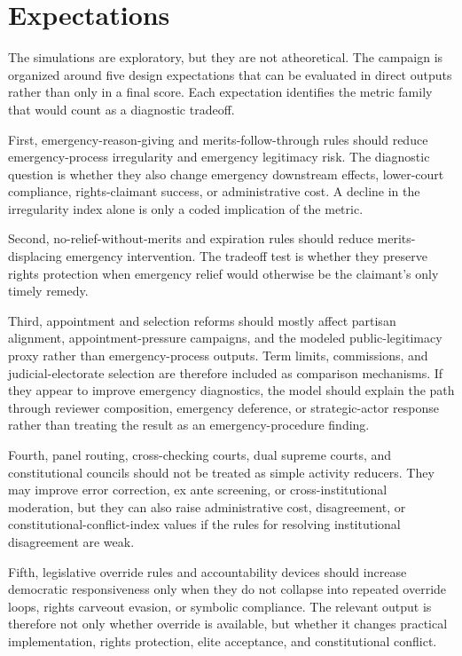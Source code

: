 \documentclass[
    journal=jlc,
    manuscript=research-article,
    year=2026,
  ]{cup-journal}
\begin{document}
\section{Expectations}

The simulations are exploratory, but they are not atheoretical. The campaign is organized around five design expectations that can be evaluated in direct outputs rather than only in a final score. Each expectation identifies the metric family that would count as a diagnostic tradeoff.

First, emergency-reason-giving and merits-follow-through rules should reduce emergency-process irregularity and emergency legitimacy risk. The diagnostic question is whether they also change emergency downstream effects, lower-court compliance, rights-claimant success, or administrative cost. A decline in the irregularity index alone is only a coded implication of the metric.

Second, no-relief-without-merits and expiration rules should reduce merits-displacing emergency intervention. The tradeoff test is whether they preserve rights protection when emergency relief would otherwise be the claimant's only timely remedy.

Third, appointment and selection reforms should mostly affect partisan alignment, appointment-pressure campaigns, and the modeled public-legitimacy proxy rather than emergency-process outputs. Term limits, commissions, and judicial-electorate selection are therefore included as comparison mechanisms. If they appear to improve emergency diagnostics, the model should explain the path through reviewer composition, emergency deference, or strategic-actor response rather than treating the result as an emergency-procedure finding.

Fourth, panel routing, cross-checking courts, dual supreme courts, and constitutional councils should not be treated as simple activity reducers. They may improve error correction, ex ante screening, or cross-institutional moderation, but they can also raise administrative cost, disagreement, or constitutional-conflict-index values if the rules for resolving institutional disagreement are weak.

Fifth, legislative override rules and accountability devices should increase democratic responsiveness only when they do not collapse into repeated override loops, rights carveout evasion, or symbolic compliance. The relevant output is therefore not only whether override is available, but whether it changes practical implementation, rights protection, elite acceptance, and constitutional conflict.
\end{document}
